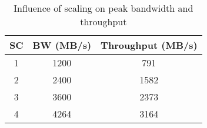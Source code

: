 

\begin{table}[H]
\begin{center}
\begin{tabular}{ccc}
\toprule
\textbf{SC} & \textbf{BW (MB/s)} & \textbf{Throughput (MB/s)} \\ \midrule
1 & 1200 & 791 \\ 
2 & 2400 & 1582 \\ 
3 & 3600 & 2373 \\ 
4 & 4264 & 3164 \\ \bottomrule
\end{tabular}
\caption{Influence of scaling on peak bandwidth and throughput}
\label{tab:bwscale}
\end{center}
\end{table}
